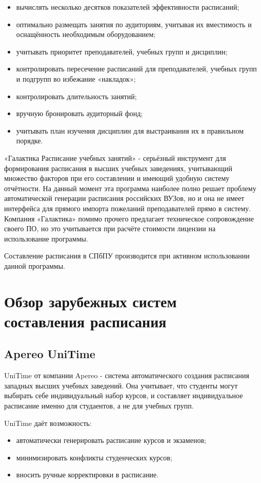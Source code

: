 \begin{itemize}
	\item вычислять несколько десятков показателей эффективности расписаний;
	\item оптимально размещать занятия по аудиториям, учитывая их вместимость и оснащённость необходимым оборудованием;
	\item учитывать приоритет преподавателей, учебных групп и дисциплин;
	\item контролировать пересечение расписаний для преподавателей, учебных групп и подгрупп во избежание «накладок»;
	\item контролировать длительность занятий;
	\item вручную бронировать аудиторный фонд;
	\item учитывать план изучения дисциплин для выстраивания их в правильном порядке.
\end{itemize}

«Галактика Расписание учебных занятий» - серьёзный инструмент для формирования расписания в высших учебных заведениях, учитывающий множество факторов при его составлении и имеющий удобную систему отчётности. На данный момент эта программа наиболее полно решает проблему автоматической генерации расписания российских ВУЗов, но и она не имеет интерфейса для прямого импорта пожеланий преподавателей прямо в систему. Компания «Галактика» помимо прочего предлагает техническое сопровождение своего ПО, но это учитывается при расчёте стоимости лицензии на использование программы.

Составление расписания в СПбПУ производится при активном использовании данной программы.

\section{Обзор зарубежных систем составления расписания} \label{ch1:sec3}	

\subsection {Apereo UniTime}
UniTime от компании Apereo \cite{unitime} - система автоматического создания расписания западных высших учебных заведений. Она учитывает, что студенты могут выбирать себе индивидуальный набор курсов, и составляет индивидуальное расписание именно для студаентов, а не для учебных групп. 

UniTime даёт возможность:
\begin{itemize}
	\item автоматически генерировать расписание курсов и экзаменов;
	\item минимизировать конфликты студенческих курсов;
	\item вносить ручные корректировки в расписание.
\end{itemize}

